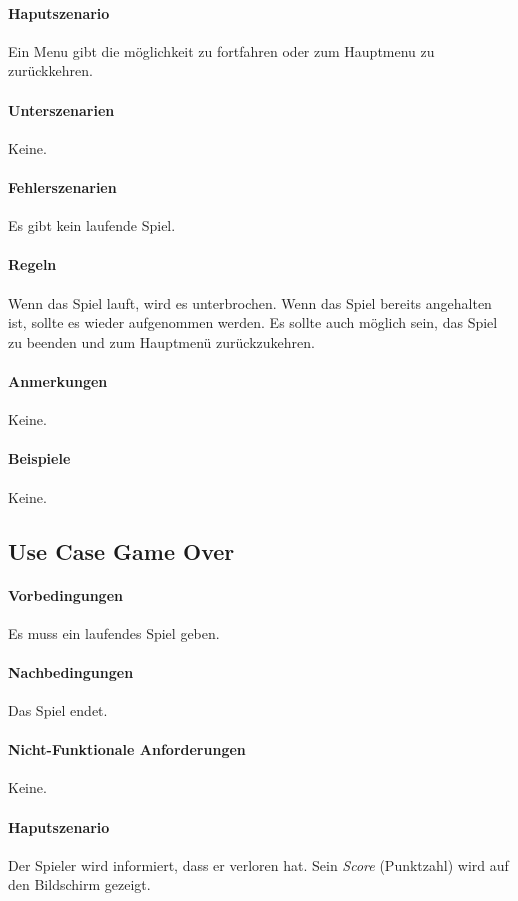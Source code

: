 \documentclass[a4paper, twosided, 11pt]{scrartcl}
\begin{document}
\paragraph{Haputszenario} Ein Menu gibt die m\"oglichkeit zu fortfahren oder
zum Hauptmenu zu zur\"uckkehren.

\paragraph{Unterszenarien} Keine.

\paragraph{Fehlerszenarien} Es gibt kein laufende Spiel.
\paragraph{Regeln}
Wenn das Spiel lauft, wird es unterbrochen. Wenn das Spiel bereits angehalten
ist, sollte es wieder aufgenommen werden. Es sollte auch möglich sein, das
Spiel zu beenden und zum Hauptmenü zurückzukehren.
\paragraph{Anmerkungen} Keine.
\paragraph{Beispiele} Keine.

\subsection{Use Case Game Over}
\paragraph{Vorbedingungen} Es muss ein laufendes Spiel geben.
\paragraph{Nachbedingungen} Das Spiel endet.
\paragraph{Nicht-Funktionale Anforderungen} Keine.
\paragraph{Haputszenario} Der Spieler wird informiert, dass er verloren hat.
Sein \emph{Score} (Punktzahl) wird auf den Bildschirm gezeigt.
\end{document}
